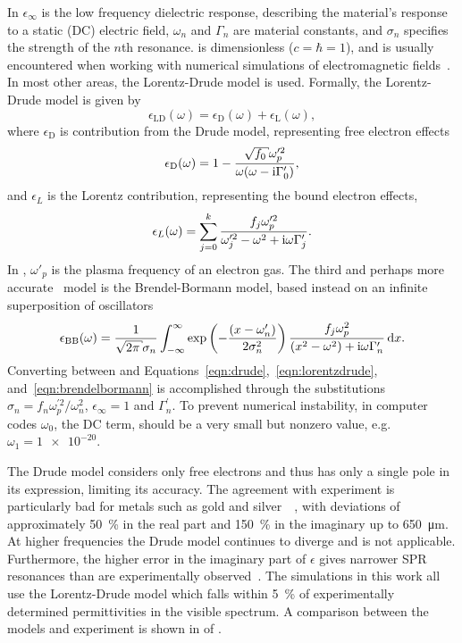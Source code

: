 In  $\epsilon_\infty$ is the low frequency
dielectric response, describing the material's response to a static (DC)
electric field, $\omega_n$ and $\Gamma_n$ are material constants, and
$\sigma_n$ specifies the strength of the $n$th resonance.
 is dimensionless ($c=\hbar=1$), and is usually
encountered when working with numerical simulations of electromagnetic
fields~\cite{oskooi2010meep}.  In most other areas, the Lorentz-Drude model is
used.  Formally, the Lorentz-Drude model is given by
\begin{equation}
\epsilon_\mathrm{LD}(\omega)=\epsilon_\mathrm{D}(\omega)+\epsilon_\mathrm{L}(\omega),
\end{equation}
where $\epsilon_\mathrm{D}$ is contribution from the Drude model, representing
free electron effects
\begin{align}
\epsilon_\mathrm{D}(\omega)=1-\frac{\sqrt{f_0} \omega_p^{\prime 2}}{\omega(\omega -
\mi\Gamma_0^\prime)},
\label{eqn:drude}
\end{align}
and $\epsilon_L$ is the Lorentz contribution, representing the bound
electron effects,
\begin{align}
\epsilon_L(\omega) =\sum_{j=0}^{k}\frac{f_j\omega_p^{\prime 2}}{\omega_j^{\prime
2}-\omega^2+{\mathrm{i}}\omega\Gamma_j^\prime}.
\label{eqn:lorentzdrude}
\end{align}
In , $\omega'_p$ is the plasma frequency of an
electron gas.  The third and perhaps more
accurate~\cite{jahanshahi2014study} model is the
Brendel-Bormann model, based instead on an infinite superposition
of oscillators
\begin{align}
\epsilon_\text{BB}(\omega) = \frac{1}{\sqrt{2 \pi} \sigma_n} \intinfty
\exp\left(-\frac{(x-\omega'_n)}{2 \sigma_n^2}\right)
\frac{f_j \omega_p^2}{(x^2-\omega^2)+\mi \omega \Gamma'_n} \md x.
\label{eqn:brendelbormann}
\end{align}
Converting between  and
Equations~\ref{eqn:drude},~\ref{eqn:lorentzdrude},
and~\ref{eqn:brendelbormann} is accomplished through the substitutions
$\sigma_n = {f_n \omega_p^{\prime 2}}/{\omega_n^2}$, $\epsilon_\infty=1$ and
$\Gamma_n^\prime$.  To prevent numerical instability, in computer codes
$\omega_0$, the DC term, should be a very small but nonzero value, e.g.
$\omega_1 = \num{1e-20}$.

The Drude model considers only free electrons and thus has only a single pole
in its expression, limiting its accuracy.  The agreement with experiment is
particularly bad for metals such as gold and
silver~\cite{ahmedcomputational}~\cite{jahanshahi2014study}, with deviations
of approximately \SI{50}{\percent} in the real part and \SI{150}{\percent} in
the imaginary up to \SI{650}{\micro\meter}.  At higher frequencies the Drude
model continues to diverge and is not applicable.  Furthermore, the higher
error in the imaginary part of $\epsilon$ gives narrower SPR resonances than
are experimentally observed~\cite{jahanshahi2014study}.  The simulations in
this work all use the Lorentz-Drude model which falls within \SI{5}{\percent}
of experimentally determined permittivities in the visible spectrum. A
comparison between the models and experiment is shown in
 of .
